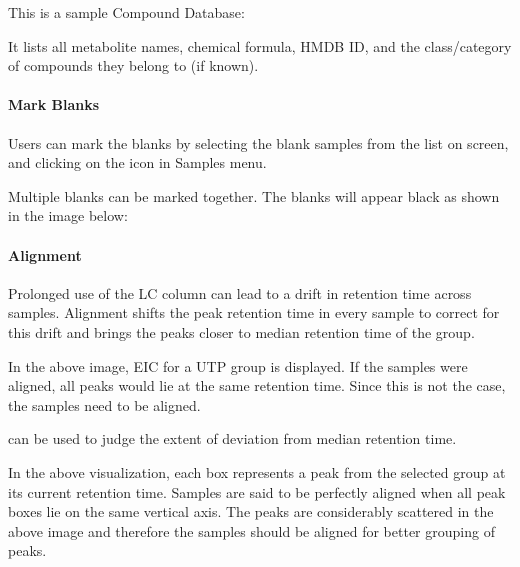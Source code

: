 \documentclass[letterpaper,10pt,english,openany,oneside]{sphinxmanual}
\begin{document}

This is a sample Compound Database:


It lists all metabolite names, chemical formula, HMDB ID, and the class/category of compounds they belong to (if known).


\paragraph{Mark Blanks}
\label{\detokenize{UnlabeledLCMSWorkflow:mark-blanks}}
Users can mark the blanks by selecting the blank samples from the list on screen, and clicking on the  icon  in Samples menu.


Multiple blanks can be marked together. The blanks will appear black as shown in the image below:



\paragraph{Alignment}
\label{\detokenize{UnlabeledLCMSWorkflow:alignment}}
Prolonged use of the LC column can lead to a drift in retention time across samples. Alignment shifts the peak retention time in every sample to correct for this drift and brings the peaks closer to median retention time of the group.


In the above image, EIC for a UTP group is displayed. If the samples were aligned, all peaks would lie at the same retention time. Since this is not the case, the samples need to be aligned.

  can be used to judge the extent of deviation from median retention time.


In the above visualization, each box represents a peak from the selected group at its current retention time. Samples are said to be perfectly aligned when all peak boxes lie on the same vertical axis. The peaks are considerably scattered in the above image and therefore the samples should be aligned for better grouping of peaks.
\end{document}
